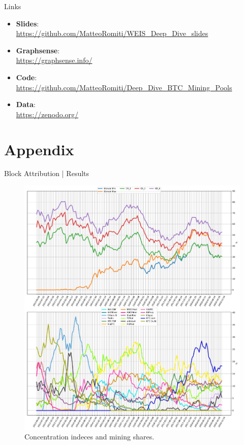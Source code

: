 \documentclass[10pt]{beamer}
\begin{document}
\begin{frame}[fragile]{Links}
    \begin{itemize}
        \item \textbf{Slides}:\\ \url{https://github.com/MatteoRomiti/WEIS_Deep_Dive_slides} 
        \item \textbf{Graphsense}:\\ \url{https://graphsense.info/} 
        \item \textbf{Code}:\\ \url{https://github.com/MatteoRomiti/Deep_Dive_BTC_Mining_Pools} 
        \item \textbf{Data}:\\ \url{https://zenodo.org/}
    \end{itemize}
\end{frame}


%   
%   

\section{Appendix}
\begin{frame}[fragile]{Block Attribution | Results}
    \begin{figure}
        \centering
        \includegraphics[width=.6\textwidth]{images/mining_distribution_157.pdf}
        \caption{Concentration indeces and mining shares.} \label{fig:mining_distribution}
    \end{figure}
\end{frame}
\end{document}
